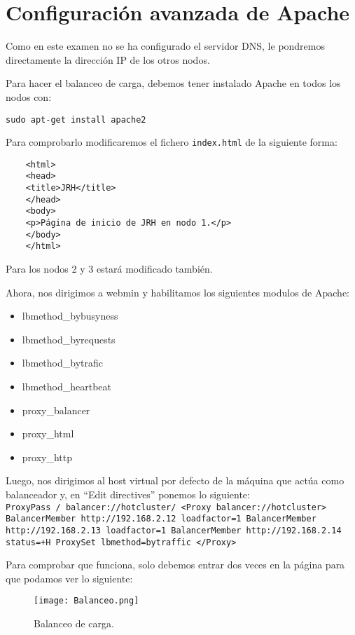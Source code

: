 \documentclass[12pt,letterpaper]{article}
\begin{document}
\section{Configuración avanzada de Apache}
Como en este examen no se ha configurado el servidor DNS, le pondremos directamente la dirección IP de los otros nodos.

Para hacer el balanceo de carga, debemos tener instalado Apache en todos los nodos con:
\begin{center}
	\texttt{sudo apt-get install apache2}
\end{center}

Para comprobarlo modificaremos el fichero \texttt{index.html} de la siguiente forma:
\begin{lstlisting}
	<html>
	<head>
	<title>JRH</title>
	</head>
	<body>
	<p>Página de inicio de JRH en nodo 1.</p>
	</body>
	</html>
\end{lstlisting}

Para los nodos 2 y 3 estará modificado también.

Ahora, nos dirigimos a webmin y habilitamos los siguientes modulos de Apache:
\begin{itemize}
	\item lbmethod\_bybusyness
	\item lbmethod\_byrequests
	\item lbmethod\_bytrafic
	\item lbmethod\_heartbeat
	\item proxy\_balancer
	\item proxy\_html
	\item proxy\_http
\end{itemize}

Luego, nos dirigimos al host virtual por defecto de la máquina que actúa como balanceador y, en “Edit directives” ponemos lo siguiente:\\

\noindent
\texttt{ProxyPass / balancer://hotcluster/
	<Proxy balancer://hotcluster>
	BalancerMember http://192.168.2.12 loadfactor=1
	BalancerMember http://192.168.2.13 loadfactor=1
	BalancerMember http://192.168.2.14 status=+H
	ProxySet lbmethod=bytraffic
	</Proxy>}

\newpage
Para comprobar que funciona, solo debemos entrar dos veces en la página para que podamos ver lo siguiente:
\begin{figure}[h]
	\centering
	\texttt{[image: Balanceo.png]}
	\caption{Balanceo de carga.}
	\label{Balanceo de carga}
\end{figure}
\end{document}
